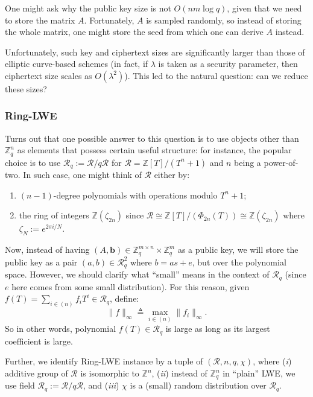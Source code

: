 \documentclass{template}
\begin{document}
\begin{remark}\label{remark:seeded-a}
    One might ask why the public key size is not $O(nm\log q)$, given that we need
to store the matrix $A$. Fortunately, $A$ is sampled randomly, so instead of
storing the whole matrix, one might store the seed from which one can derive
$A$ instead.
\end{remark}

Unfortunately, such key and ciphertext sizes are significantly larger than those
of elliptic curve-based schemes (in fact, if $\lambda$ is taken as a security
parameter, then ciphertext size scales as $O(\lambda^2)$). This led to the
natural question: can we reduce these sizes?

\subsubsection{Ring-LWE}

Turns out that one possible answer to this question is to use objects other than
$\mathbb{Z}_q^n$ as elements that possess certain useful structure: for
instance, the popular choice is to use $\mathcal{R}_q :=
\mathcal{R}/q\mathcal{R}$ for $\mathcal{R} = \mathbb{Z}[T]/(T^n+1)$ and $n$
being a power-of-two. In such case, one might think of $\mathcal{R}$ either by: 
\begin{enumerate}
    \item[(a)] $(n-1)$-degree polynomials with operations modulo $T^n+1$;
    \item[(b)] the ring of integers $\mathbb{Z}(\zeta_{2n})$ since $\mathcal{R}
\cong \mathbb{Z}[T]/(\Phi_{2n}(T)) \cong \mathbb{Z}(\zeta_{2n})$ where $\zeta_N
:= e^{2\pi i/N}$.
\end{enumerate}

Now, instead of having $(A,\mathbf{b}) \in \mathbb{Z}_q^{m \times n} \times
\mathbb{Z}_q^m$ as a public key, we will store the public key as a pair $(a,b)
\in \mathcal{R}_q^2$ where $b=as+e$, but over the polynomial space. However, we
should clarify what ``small'' means in the context of $\mathcal{R}_q$ (since $e$
here comes from some small distribution). For this reason, given $f(T)=\sum_{i
\in (n)}f_iT^i \in \mathcal{R}_q$, define:
\begin{equation*}
    \|f\|_{\infty} \triangleq \max_{i \in (n)}\|f_i\|_{\infty}.
\end{equation*}
So in other words, polynomial $f(T) \in \mathcal{R}_q$ is large as long as its
largest coefficient is large. 

Further, we identify Ring-LWE instance by a tuple of $(\mathcal{R},n,q,\chi)$,
where (\textit{i}) additive group of $\mathcal{R}$ is isomorphic to
$\mathbb{Z}^n$, (\textit{ii}) instead of $\mathbb{Z}_q^n$ in ``plain'' LWE, we
use field $\mathcal{R}_q := \mathcal{R}/q\mathcal{R}$, and (\textit{iii}) $\chi$
is a (small) random distribution over $\mathcal{R}_q$.
\end{document}
